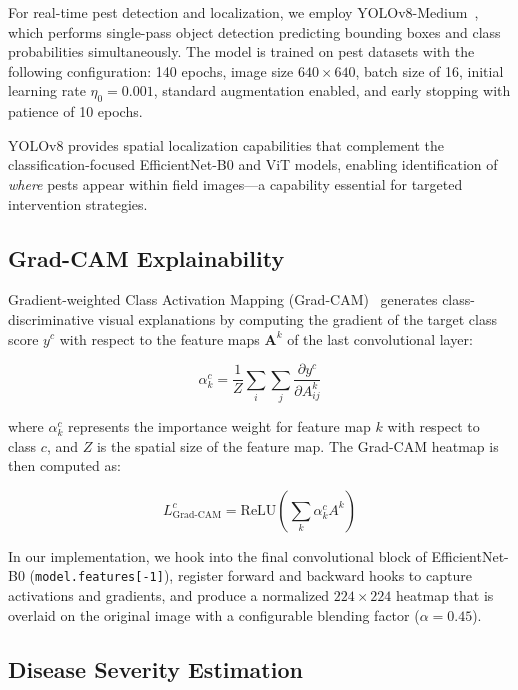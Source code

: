 \documentclass[conference]{IEEEtran}
\begin{document}
For real-time pest detection and localization, we employ YOLOv8-Medium~\cite{ultralytics2024}, which performs single-pass object detection predicting bounding boxes and class probabilities simultaneously. The model is trained on pest datasets with the following configuration: 140 epochs, image size $640 \times 640$, batch size of 16, initial learning rate $\eta_0 = 0.001$, standard augmentation enabled, and early stopping with patience of 10 epochs.

YOLOv8 provides spatial localization capabilities that complement the classification-focused EfficientNet-B0 and ViT models, enabling identification of \textit{where} pests appear within field images—a capability essential for targeted intervention strategies.

\subsection{Grad-CAM Explainability}

Gradient-weighted Class Activation Mapping (Grad-CAM)~\cite{selvaraju2017gradcam} generates class-discriminative visual explanations by computing the gradient of the target class score $y^c$ with respect to the feature maps $\mathbf{A}^k$ of the last convolutional layer:

\begin{equation}
    \alpha_k^c = \frac{1}{Z} \sum_i \sum_j \frac{\partial y^c}{\partial A_{ij}^k}
\end{equation}

\noindent where $\alpha_k^c$ represents the importance weight for feature map $k$ with respect to class $c$, and $Z$ is the spatial size of the feature map. The Grad-CAM heatmap is then computed as:

\begin{equation}
    L_{\text{Grad-CAM}}^c = \mathrm{ReLU}\!\left(\sum_k \alpha_k^c A^k\right)
\end{equation}

In our implementation, we hook into the final convolutional block of EfficientNet-B0 (\texttt{model.features[-1]}), register forward and backward hooks to capture activations and gradients, and produce a normalized $224 \times 224$ heatmap that is overlaid on the original image with a configurable blending factor ($\alpha = 0.45$).

\subsection{Disease Severity Estimation}
\end{document}
